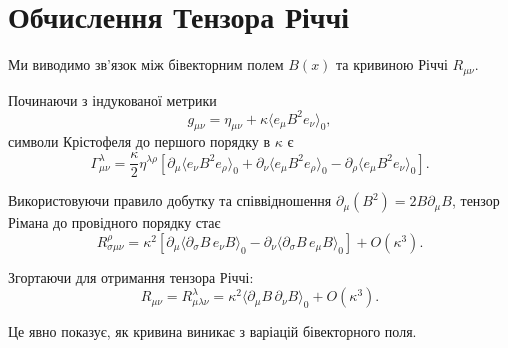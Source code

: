 \documentclass[11pt,a4paper]{article}
\numberwithin{equation}{section}
\theoremstyle{plain}
\theoremstyle{definition}
\theoremstyle{remark}
\begin{document}
\appendix
\section{Обчислення Тензора Річчі}
\label{app:ricci}

Ми виводимо зв'язок між бівекторним полем $B(x)$ та кривиною Річчі $R_{\mu\nu}$.

Починаючи з індукованої метрики
\begin{equation}
g_{\mu\nu} = \eta_{\mu\nu} + \kappa \langle e_\mu B^2 e_\nu \rangle_0,
\end{equation}
символи Крістофеля до першого порядку в $\kappa$ є
\begin{equation}
\Gamma^\lambda_{\mu\nu} = \frac{\kappa}{2} \eta^{\lambda\rho} \left[\partial_\mu \langle e_\nu B^2 e_\rho \rangle_0 + \partial_\nu \langle e_\mu B^2 e_\rho \rangle_0 - \partial_\rho \langle e_\mu B^2 e_\nu \rangle_0\right].
\end{equation}

Використовуючи правило добутку та співвідношення $\partial_\mu (B^2) = 2 B \partial_\mu B$, тензор Рімана до провідного порядку стає
\begin{equation}
R^\rho_{\sigma\mu\nu} = \kappa^2 \left[\partial_\mu \langle \partial_\sigma B \, e_\nu B \rangle_0 - \partial_\nu \langle \partial_\sigma B \, e_\mu B \rangle_0\right] + O(\kappa^3).
\end{equation}

Згортаючи для отримання тензора Річчі:
\begin{equation}
R_{\mu\nu} = R^\lambda_{\mu\lambda\nu} = \kappa^2 \langle \partial_\mu B \, \partial_\nu B \rangle_0 + O(\kappa^3).
\end{equation}

Це явно показує, як кривина виникає з варіацій бівекторного поля.

\end{document}
